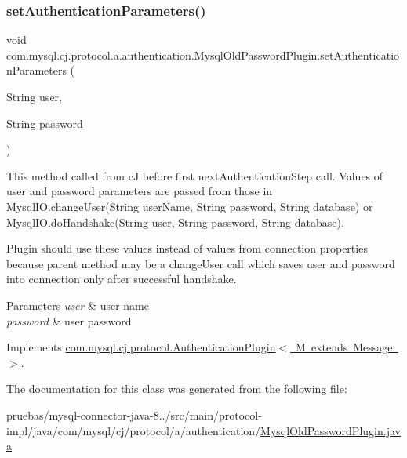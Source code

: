 \subsubsection{\texorpdfstring{set\+Authentication\+Parameters()}{setAuthenticationParameters()}}
{\footnotesize\ttfamily void com.\+mysql.\+cj.\+protocol.\+a.\+authentication.\+Mysql\+Old\+Password\+Plugin.\+set\+Authentication\+Parameters (\begin{DoxyParamCaption}\item[{String}]{user,  }\item[{String}]{password }\end{DoxyParamCaption})}

This method called from cJ before first next\+Authentication\+Step call. Values of user and password parameters are passed from those in Mysql\+I\+O.\+change\+User(String user\+Name, String password, String database) or Mysql\+I\+O.\+do\+Handshake(String user, String password, String database).

Plugin should use these values instead of values from connection properties because parent method may be a change\+User call which saves user and password into connection only after successful handshake.


\begin{DoxyParams}{Parameters}
{\em user} & user name \\
\hline
{\em password} & user password \\
\hline
\end{DoxyParams}


Implements \mbox{\hyperlink{interfacecom_1_1mysql_1_1cj_1_1protocol_1_1_authentication_plugin_a22458c3992dbf9f91560d75a99e234d3}{com.\+mysql.\+cj.\+protocol.\+Authentication\+Plugin$<$ M extends Message $>$}}.



The documentation for this class was generated from the following file\+:\begin{DoxyCompactItemize}
\item 
pruebas/mysql-\/connector-\/java-\/8../src/main/protocol-\/impl/java/com/mysql/cj/protocol/a/authentication/\mbox{\hyperlink{_mysql_old_password_plugin_8java}{Mysql\+Old\+Password\+Plugin.\+java}}\end{DoxyCompactItemize}
